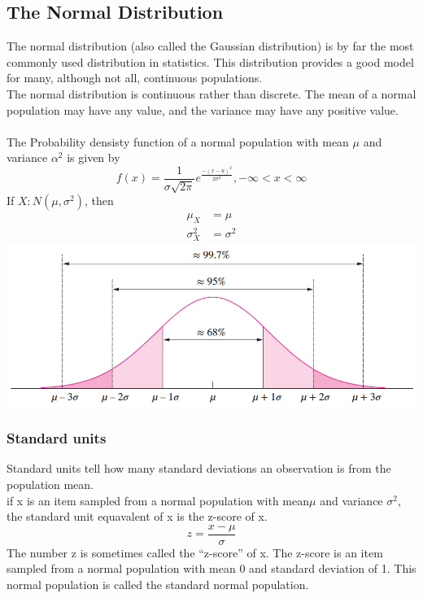 \documentclass[../main.tex]{subfiles}
\begin{document}
\subsection{The Normal Distribution}
The normal distribution (also called the Gaussian distribution) is by far the most commonly used distribution in statistics. This distribution provides a good model for many, although not all, continuous populations. \\
The normal distribution is continuous rather than discrete. The mean of a normal population may have any value, and the variance may have any positive value.\\
\\
The Probability densisty function of a normal population with mean $\mu$ and variance $\alpha^2$ is given by
\begin{equation*}
    f(x)=\frac{1}{\sigma\sqrt{2\pi}}e^{\frac{-(x-u)^2}{2\sigma^2}}, -\infty < x < \infty
\end{equation*}
If $X:N(\mu, \sigma^2)$, then 
\begin{align*}
    \mu_X &= \mu\\
    \sigma_X^2 &= \sigma^2
\end{align*}
\includegraphics[width=15cm]{Sections/Image/population.png}
\\
\subsubsection*{Standard units}
Standard units tell how many standard deviations an observation is from the population mean.\\
if x is an item sampled from a normal population with mean$\mu$ and variance $\sigma^2$, the standard unit equavalent of x is the z-score of x.
$$z=\frac{x-\mu}{\sigma}$$
The number z is sometimes called the “z-score” of x. The z-score is an item sampled from a normal population with mean 0 and standard deviation of 1. This normal population is called the standard normal population.
\end{document}
